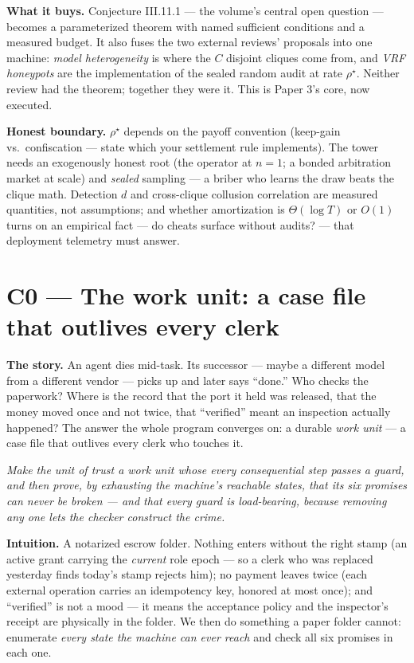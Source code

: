 \documentclass[11pt,a4paper]{article}
\newcommand{\onebreath}[1]{\begin{center}\emph{#1}\end{center}}
\begin{document}
\textbf{What it buys.} Conjecture III.11.1 --- the volume's central open question --- becomes a parameterized theorem with named sufficient conditions and a measured budget. It also fuses the two external reviews' proposals into one machine: \emph{model heterogeneity} is where the $C$ disjoint cliques come from, and \emph{VRF honeypots} are the implementation of the sealed random audit at rate $\rho^\star$. Neither review had the theorem; together they were it. This is Paper 3's core, now executed.

\begin{boundary}
\textbf{Honest boundary.} $\rho^\star$ depends on the payoff convention (keep-gain vs.\ confiscation --- state which your settlement rule implements). The tower needs an exogenously honest root (the operator at $n{=}1$; a bonded arbitration market at scale) and \emph{sealed} sampling --- a briber who learns the draw beats the clique math. Detection $d$ and cross-clique collusion correlation are measured quantities, not assumptions; and whether amortization is $\Theta(\log T)$ or $O(1)$ turns on an empirical fact --- do cheats surface without audits? --- that deployment telemetry must answer.
\end{boundary}

\section{C0 --- The work unit: a case file that outlives every clerk}
\textbf{The story.} An agent dies mid-task. Its successor --- maybe a different model from a different vendor --- picks up and later says ``done.'' Who checks the paperwork? Where is the record that the port it held was released, that the money moved once and not twice, that ``verified'' meant an inspection actually happened? The answer the whole program converges on: a durable \emph{work unit} --- a case file that outlives every clerk who touches it.

\onebreath{Make the unit of trust a work unit whose every consequential step passes a guard, and then \emph{prove}, by exhausting the machine's reachable states, that its six promises can never be broken --- and that every guard is load-bearing, because removing any one lets the checker construct the crime.}

\textbf{Intuition.} A notarized escrow folder. Nothing enters without the right stamp (an active grant carrying the \emph{current} role epoch --- so a clerk who was replaced yesterday finds today's stamp rejects him); no payment leaves twice (each external operation carries an idempotency key, honored at most once); and ``verified'' is not a mood --- it means the acceptance policy and the inspector's receipt are physically in the folder. We then do something a paper folder cannot: enumerate \emph{every state the machine can ever reach} and check all six promises in each one.
\end{document}
